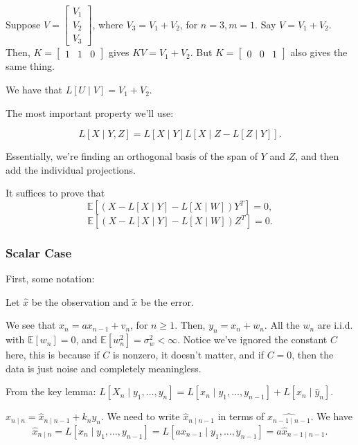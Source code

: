 \documentclass{article}
\newcommand{\EE}{\mathbb{E}}
\begin{document}
\begin{example}
	Suppose $V = \begin{bmatrix} V_1 \\ V_2 \\ V_3 \end{bmatrix}$, where $V_3 = V_1 + V_2$, for $n = 3, m = 1$. Say $V = V_1 + V_2$. Then, $K = \begin{bmatrix} 1 & 1 & 0 \end{bmatrix}$ gives $KV = V_1 + V_2$. But $K = \begin{bmatrix} 0 & 0 & 1 \end{bmatrix}$ also gives the same thing. 

	We have that $L[U \mid V] = V_1 + V_2$.
\end{example}

The most important property we'll use: 
\begin{lemma}
\[L[X \mid Y, Z] = L[X \mid Y] L[X \mid Z - L[Z \mid Y]].\]
\end{lemma}
Essentially, we're finding an orthogonal basis of the span of $Y$ and $Z$, and then add the individual projections.

It suffices to prove that
\[\EE[(X - L[X \mid Y] - L[X \mid W]) Y^T] = 0,\] 
\[\EE[(X - L[X \mid Y] - L[X \mid W]) Z^T] = 0.\]

\subsubsection{Scalar Case} 
First, some notation:
\begin{definition}
	Let $\hat{x}$ be the observation and $\tilde{x}$ be the error.
\end{definition}

We see that $x_n = a x_{n-1} + v_n$, for $n \geq 1$. Then, $y_n = x_n + w_n$. All the $w_n$ are i.i.d. with $\EE[w_n] = 0$, and $\EE[w_n^2] = \sigma_{w}^2 < \infty$. 
Notice we've ignored the constant $C$ here, this is because if $C$ is nonzero, it doesn't matter, and if $C = 0$, then the data is just noise and completely meaningless.

From the key lemma:
$L[X_n \mid y_1, \ldots, y_n] = L[x_n \mid y_1, \ldots, y_{n - 1}] + L[x_n \mid \hat{y}_n]$. 

$\hat{x}_{n \mid n} = \hat{x}_{n \mid n - 1} + k_n y_n$. We need to write $\hat{x}_{n \mid n-1}$ in terms of $\hat{x_{n - 1 \mid n - 1}}$. We have 
\[\hat{x}_{n \mid n} = L[x_n \mid y_1, \ldots, y_{n - 1}] = L[ax_{n - 1} \mid y_1, \ldots, y_{n-1}] = a\hat{x}_{n-1 \mid n-1}.\]
\end{document}
